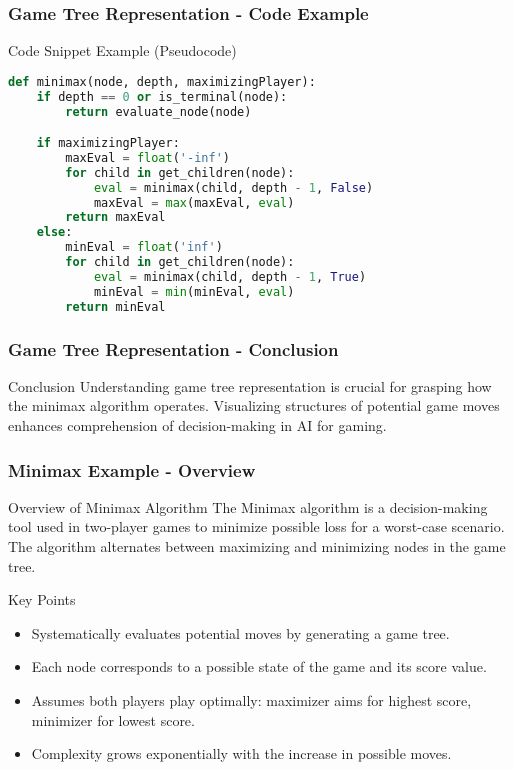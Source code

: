 \documentclass[aspectratio=169]{beamer}
\begin{document}
\begin{frame}[fragile]
    \frametitle{Game Tree Representation - Code Example}
    \begin{block}{Code Snippet Example (Pseudocode)}
        \begin{lstlisting}[language=Python]
def minimax(node, depth, maximizingPlayer):
    if depth == 0 or is_terminal(node):
        return evaluate_node(node)

    if maximizingPlayer:
        maxEval = float('-inf')
        for child in get_children(node):
            eval = minimax(child, depth - 1, False)
            maxEval = max(maxEval, eval)
        return maxEval
    else:
        minEval = float('inf')
        for child in get_children(node):
            eval = minimax(child, depth - 1, True)
            minEval = min(minEval, eval)
        return minEval
        \end{lstlisting}
    \end{block}
\end{frame}

\begin{frame}[fragile]
    \frametitle{Game Tree Representation - Conclusion}
    \begin{block}{Conclusion}
        Understanding game tree representation is crucial for grasping how the minimax algorithm operates. Visualizing structures of potential game moves enhances comprehension of decision-making in AI for gaming.
    \end{block}
\end{frame}

\begin{frame}[fragile]
    \frametitle{Minimax Example - Overview}
    \begin{block}{Overview of Minimax Algorithm}
        The Minimax algorithm is a decision-making tool used in two-player games to minimize possible loss for a worst-case scenario. The algorithm alternates between maximizing and minimizing nodes in the game tree.
    \end{block}
    
    \begin{block}{Key Points}
        \begin{itemize}
            \item Systematically evaluates potential moves by generating a game tree.
            \item Each node corresponds to a possible state of the game and its score value.
            \item Assumes both players play optimally: maximizer aims for highest score, minimizer for lowest score.
            \item Complexity grows exponentially with the increase in possible moves.
        \end{itemize}
    \end{block}
\end{frame}
\end{document}
